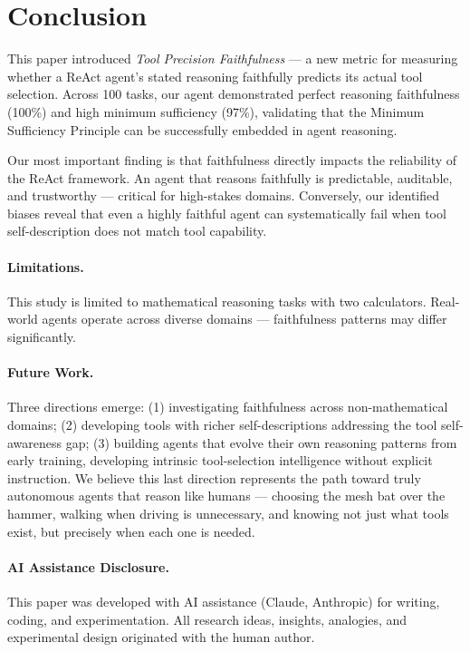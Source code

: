 \documentclass{article}
\begin{document}
\section{Conclusion}

This paper introduced \textit{Tool Precision Faithfulness} --- a new metric for measuring whether a ReAct agent's stated reasoning faithfully predicts its actual tool selection. Across 100 tasks, our agent demonstrated perfect reasoning faithfulness (100\%) and high minimum sufficiency (97\%), validating that the Minimum Sufficiency Principle can be successfully embedded in agent reasoning.

Our most important finding is that faithfulness directly impacts the reliability of the ReAct framework. An agent that reasons faithfully is predictable, auditable, and trustworthy --- critical for high-stakes domains. Conversely, our identified biases reveal that even a highly faithful agent can systematically fail when tool self-description does not match tool capability.

\paragraph{Limitations.} This study is limited to mathematical reasoning tasks with two calculators. Real-world agents operate across diverse domains --- faithfulness patterns may differ significantly.

\paragraph{Future Work.} Three directions emerge: (1) investigating faithfulness across non-mathematical domains; (2) developing tools with richer self-descriptions addressing the tool self-awareness gap; (3) building agents that evolve their own reasoning patterns from early training, developing intrinsic tool-selection intelligence without explicit instruction. We believe this last direction represents the path toward truly autonomous agents that reason like humans --- choosing the mesh bat over the hammer, walking when driving is unnecessary, and knowing not just what tools exist, but precisely when each one is needed.

\paragraph{AI Assistance Disclosure.} This paper was developed with AI assistance (Claude, Anthropic) for writing, coding, and experimentation. All research ideas, insights, analogies, and experimental design originated with the human author.
\end{document}
